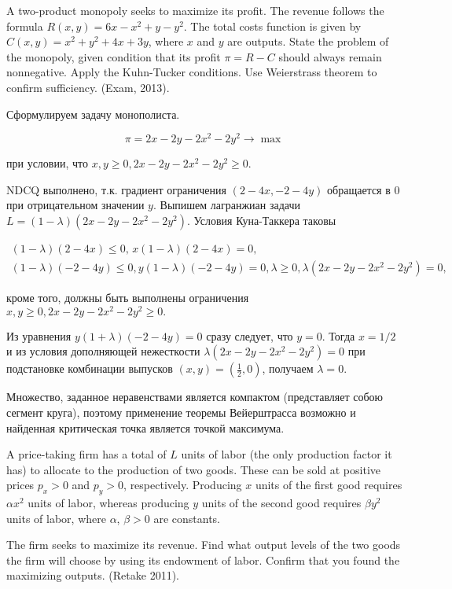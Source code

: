 \begin{problem} 
A two-product monopoly seeks to maximize its profit. The revenue follows the formula $R(x,y)=6x-x^{2} +y-y^{2} $. The total costs function is given by $C(x,y)=x^{2} +y^{2} +4x+3y$, where $x$ and $y$ are outputs. State the problem of the monopoly, given condition that its profit $\pi =R-C$ should always remain nonnegative. Apply the Kuhn-Tucker conditions. Use Weierstrass theorem to confirm sufficiency. (Exam, 2013).
\end{problem}

\begin{solution}
Сформулируем задачу монополиста.

\[\pi =2x-2y-2x^{2} -2y^{2} \to \max \] 

при условии, что $x,y\ge 0,  2x-2y-2x^{2} -2y^{2} \ge 0.$

NDCQ выполнено, т.к. градиент ограничения $(2-4x,-2-4y)$ обращается в 0 при отрицательном значении $y$. Выпишем лагранжиан задачи $L=(1-\lambda )(2x-2y-2x^{2} -2y^{2} )$. Условия Куна-Таккера таковы

\[\begin{array}{l} {(1-\lambda )(2-4x)\le 0,\, x(1-\lambda )(2-4x)=0,} \\ {(1-\lambda )(-2-4y)\le 0,  y(1-\lambda )(-2-4y)=0,  \lambda \ge 0,  \lambda (2x-2y-2x^{2} -2y^{2} )=0,} \end{array}\] 

кроме того, должны быть выполнены ограничения $x,y\ge 0,  2x-2y-2x^{2} -2y^{2} \ge 0.$

Из уравнения $y(1+\lambda)(-2-4y)=0$ сразу следует, что $y=0$. Тогда $x=1/2$ и из условия дополняющей нежесткости $\lambda(2x-2y-2x^2-2y^2)=0$ при подстановке комбинации выпусков $(x,y)=(\frac{1}{2} ,0)$, получаем  $\lambda =0$. 

Множество, заданное неравенствами является компактом (представляет собою сегмент круга), поэтому применение теоремы Вейерштрасса возможно и найденная критическая точка является точкой максимума.
\end{solution}

\begin{problem}
A price-taking firm has a total of $L$ units of labor (the only production factor it has) to allocate to the production of two goods. These can be sold at positive prices $p_{x} >0$ and $p_{y} >0$, respectively. Producing $x$ units of the first good requires $\alpha x^{2} $ units of labor, whereas producing  $y$ units of the second good requires $\beta y^{2} $ units of labor, where $\alpha$, $\beta >0$ are constants.

The firm seeks to maximize its revenue. Find what output levels of the two goods the firm will choose by using its endowment of labor. Confirm that you found the maximizing outputs. (Retake 2011).
\end{problem}

